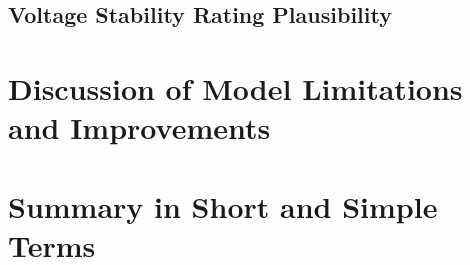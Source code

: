 \subsection{Voltage Stability Rating Plausibility}


\section{Discussion of Model Limitations and Improvements}

\section{Summary in Short and Simple Terms}